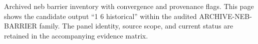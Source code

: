 Archived neb barrier inventory with convergence and provenance flags. This page shows the candidate output ``1 6 historical'' within the audited ARCHIVE-NEB-BARRIER family. The panel identity, source scope, and current status are retained in the accompanying evidence matrix.
